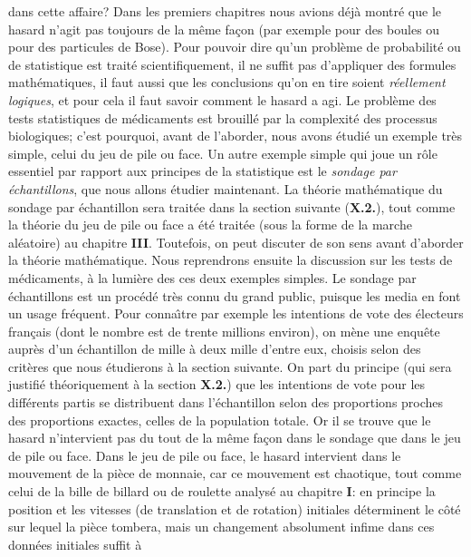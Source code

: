 dans cette affaire? Dans les premiers chapitres nous avions d\'ej\`a
montr\'e que le hasard n'agit pas toujours de la m\^eme fa\c{c}on 
(par exemple pour des boules ou pour des particules de Bose). Pour 
pouvoir dire qu'un probl\`eme de probabilit\'e ou de statistique est 
trait\'e scientifiquement, il ne suffit pas d'appliquer des formules 
math\'ematiques, il faut aussi que les conclusions qu'on en tire soient 
{\it r\' eellement logiques}, et pour cela il faut savoir comment le 
hasard a agi. Le probl\`eme des tests statistiques de m\'edicaments est 
brouill\'e par la complexit\'e des processus biologiques; c'est pourquoi, 
avant de l'aborder, nous avons \'etudi\'e un exemple tr\`es simple, celui 
du jeu de pile ou face. Un autre exemple simple qui joue un r\^ole 
essentiel par rapport aux principes de la statistique est le {\it sondage 
par \'echantillons}, que nous allons \'etudier maintenant. La th\'eorie 
math\'ematique du sondage par \'echantillon sera trait\'ee dans la 
section suivante ({\bf X.2.}), tout comme la th\'eorie du jeu de pile 
ou face a \'et\'e trait\'ee (sous la forme de la marche al\'eatoire) au 
chapitre {\bf III}. Toutefois, on peut discuter de son sens avant 
d'aborder la th\'eorie math\'ematique.  Nous reprendrons ensuite la 
discussion sur les tests de m\'edicaments, \`a la lumi\`ere des ces deux 
exemples simples. 
\medskip
Le sondage par \'echantillons est un proc\'ed\'e tr\`es connu du grand
public, puisque les media en font un usage fr\'equent. Pour conna{\^\i}tre
par exemple les intentions de vote des \'electeurs fran\c{c}ais (dont le 
nombre est de trente millions environ), on m\`ene une enqu\^ete aupr\`es
d'un \'echantillon de mille \`a deux mille d'entre eux, choisis selon des
crit\`eres que nous \'etudierons \`a la section suivante. On part du
principe (qui sera justifi\'e th\'eoriquement \`a la section {\bf X.2.}) que 
les intentions de vote pour les diff\'erents partis se distribuent dans 
l'\'echantillon selon des proportions proches des proportions exactes, 
celles de la population totale. Or il se trouve que le hasard n'intervient
pas du tout de la m\^eme fa\c{c}on dans le sondage que dans le jeu de pile 
ou face. 
\medskip 
Dans le jeu de pile ou face, le hasard intervient dans le mouvement de la 
pi\`ece de monnaie, car ce mouvement est chaotique, tout comme celui
de la bille de billard ou de roulette analys\'e au chapitre {\bf I}: en 
principe la position et les vitesses (de translation et de rotation) 
initiales d\'eterminent le c\^ot\'e sur lequel la pi\`ece tombera, mais un 
changement absolument infime dans ces donn\'ees initiales suffit \`a 
